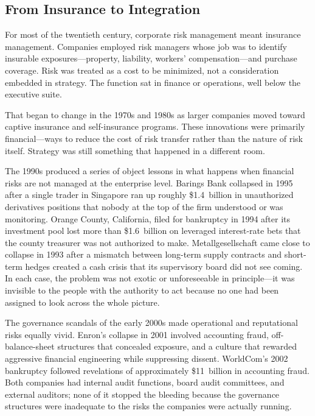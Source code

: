 \documentclass[11pt,openany]{book}
\begin{document}
\subsection{From Insurance to Integration}
\label{subsec:insurance-to-integration}

For most of the twentieth century, corporate risk management meant insurance management. Companies employed risk managers whose job was to identify insurable exposures---property, liability, workers' compensation---and purchase coverage. Risk was treated as a cost to be minimized, not a consideration embedded in strategy. The function sat in finance or operations, well below the executive suite.

That began to change in the 1970s and 1980s as larger companies moved toward captive insurance and self-insurance programs. These innovations were primarily financial---ways to reduce the cost of risk transfer rather than the nature of risk itself. Strategy was still something that happened in a different room.

The 1990s produced a series of object lessons in what happens when financial risks are not managed at the enterprise level. Barings Bank collapsed in 1995 after a single trader in Singapore ran up roughly \$1.4~billion in unauthorized derivatives positions that nobody at the top of the firm understood or was monitoring. Orange County, California, filed for bankruptcy in 1994 after its investment pool lost more than \$1.6~billion on leveraged interest-rate bets that the county treasurer was not authorized to make. Metallgesellschaft came close to collapse in 1993 after a mismatch between long-term supply contracts and short-term hedges created a cash crisis that its supervisory board did not see coming. In each case, the problem was not exotic or unforeseeable in principle---it was invisible to the people with the authority to act because no one had been assigned to look across the whole picture.

The governance scandals of the early 2000s made operational and reputational risks equally vivid. Enron's collapse in 2001 involved accounting fraud, off-balance-sheet structures that concealed exposure, and a culture that rewarded aggressive financial engineering while suppressing dissent. WorldCom's 2002 bankruptcy followed revelations of approximately \$11~billion in accounting fraud. Both companies had internal audit functions, board audit committees, and external auditors; none of it stopped the bleeding because the governance structures were inadequate to the risks the companies were actually running.
\end{document}

